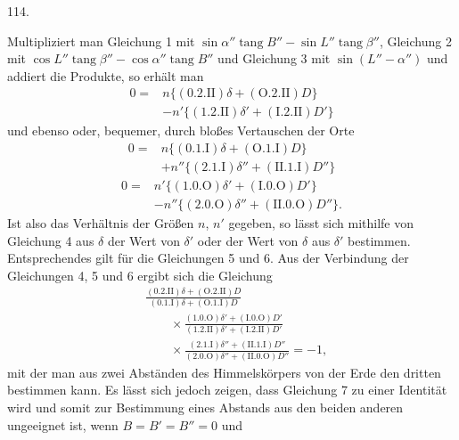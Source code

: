 \par{}\medskip
\hypertarget{native-159-article114}{}
\begin{center}114.\end{center}
Multipliziert man Gleichung 1 mit $\sin\alpha''\operatorname{tang}B''-\sin L''\operatorname{tang}\beta''$, Gleichung 2 mit $\cos L''\operatorname{tang}\beta''-\cos\alpha''\operatorname{tang}B''$ und Gleichung 3 mit $\sin(L''-\alpha'')$ und addiert die Produkte, so erhält man
\[
\begin{aligned}
0={}&n\{(0.2.\mathrm{II})\delta+(\mathrm{O}.2.\mathrm{II})D\}\\
&-n'\{(1.2.\mathrm{II})\delta'+(\mathrm{I}.2.\mathrm{II})D'\}
\end{aligned}\tag*{4)}
\]
und ebenso oder, bequemer, durch bloßes Vertauschen der Orte
\[
\begin{aligned}
0={}&n\{(0.1.\mathrm{I})\delta+(\mathrm{O}.1.\mathrm{I})D\}\\
&+n''\{(2.1.\mathrm{I})\delta''+(\mathrm{II}.1.\mathrm{I})D''\}
\end{aligned}\tag*{5)}
\]
\[
\begin{aligned}
0={}&n'\{(1.0.\mathrm{O})\delta'+(\mathrm{I}.0.\mathrm{O})D'\}\\
&-n''\{(2.0.\mathrm{O})\delta''+(\mathrm{II}.0.\mathrm{O})D''\}.
\end{aligned}\tag*{6)}
\]
Ist also das Verhältnis der Größen $n$, $n'$ gegeben, so lässt sich mithilfe von Gleichung 4 aus $\delta$ der Wert von $\delta'$ oder der Wert von $\delta$ aus $\delta'$ bestimmen. Entsprechendes gilt für die Gleichungen 5 und 6. Aus der Verbindung der Gleichungen 4, 5 und 6 ergibt sich die Gleichung
\[
\begin{aligned}
&\frac{(0.2.\mathrm{II})\delta+(\mathrm{O}.2.\mathrm{II})D}{(0.1.\mathrm{I})\delta+(\mathrm{O}.1.\mathrm{I})D}\\[.6em]
&\qquad\times\frac{(1.0.\mathrm{O})\delta'+(\mathrm{I}.0.\mathrm{O})D'}{(1.2.\mathrm{II})\delta'+(\mathrm{I}.2.\mathrm{II})D'}\\[.6em]
&\qquad\times\frac{(2.1.\mathrm{I})\delta''+(\mathrm{II}.1.\mathrm{I})D''}{(2.0.\mathrm{O})\delta''+(\mathrm{II}.0.\mathrm{O})D''}=-1,
\end{aligned}\tag*{7)}
\]
mit der man aus zwei Abständen des Himmelskörpers von der Erde den dritten bestimmen kann. Es lässt sich jedoch zeigen, dass Gleichung 7 zu einer Identität wird und somit zur Bestimmung eines Abstands aus den beiden anderen ungeeignet ist, wenn $B=B'=B''=0$ und
